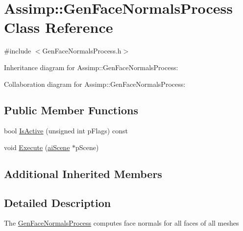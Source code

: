 \hypertarget{class_assimp_1_1_gen_face_normals_process}{\section{Assimp\+:\+:Gen\+Face\+Normals\+Process Class Reference}
\label{class_assimp_1_1_gen_face_normals_process}
}


{\ttfamily \#include $<$Gen\+Face\+Normals\+Process.\+h$>$}



Inheritance diagram for Assimp\+:\+:Gen\+Face\+Normals\+Process\+:


Collaboration diagram for Assimp\+:\+:Gen\+Face\+Normals\+Process\+:
\subsection*{Public Member Functions}
\begin{DoxyCompactItemize}
\item 
bool \hyperlink{class_assimp_1_1_gen_face_normals_process_a606f7e642574e2e266d1b6cc41392287}{Is\+Active} (unsigned int p\+Flags) const 
\item 
void \hyperlink{class_assimp_1_1_gen_face_normals_process_a13bd798170faeab9674bfbb48135b97d}{Execute} (\hyperlink{structai_scene}{ai\+Scene} $\ast$p\+Scene)
\end{DoxyCompactItemize}
\subsection*{Additional Inherited Members}


\subsection{Detailed Description}
The \hyperlink{class_assimp_1_1_gen_face_normals_process}{Gen\+Face\+Normals\+Process} computes face normals for all faces of all meshes 

